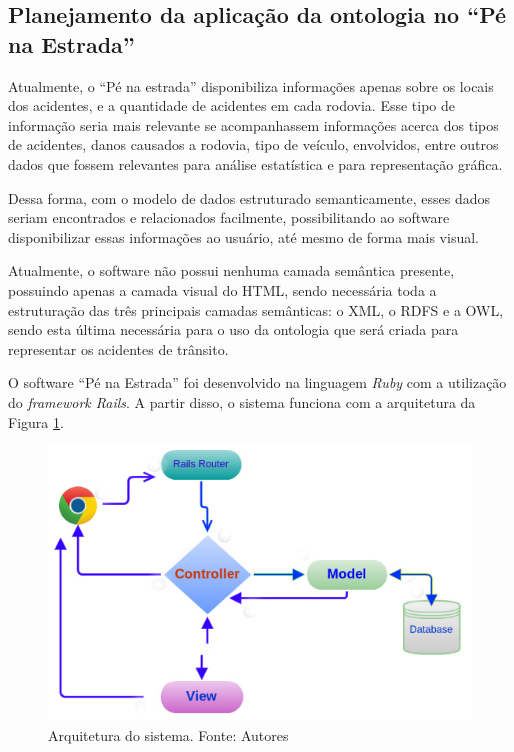 \subsection{Planejamento da aplicação da ontologia no ``Pé na Estrada''}

Atualmente, o “Pé na estrada” disponibiliza informações apenas sobre os locais dos
acidentes, e a quantidade de acidentes em cada rodovia. Esse tipo de informação seria mais
relevante se acompanhassem informações acerca dos tipos de acidentes, danos causados a
rodovia, tipo de veículo, envolvidos, entre outros dados que fossem relevantes para análise
estatística e para representação gráfica.

Dessa forma, com o modelo de dados estruturado semanticamente, esses dados seriam
encontrados e relacionados facilmente, possibilitando ao software disponibilizar essas
informações ao usuário, até mesmo de forma mais visual.

Atualmente, o software não possui nenhuma camada semântica presente, possuindo
apenas a camada visual do HTML, sendo necessária toda a estruturação das três principais
camadas semânticas: o XML, o RDFS e a OWL, sendo esta última necessária para o uso da
ontologia que será criada para representar os acidentes de trânsito.

O software ``Pé na Estrada'' foi desenvolvido na linguagem \textit{Ruby} com a utilização do \textit{framework Rails}. 
A partir disso, o sistema funciona com a arquitetura da Figura \ref{fig:arquitetura}.

\begin{figure}[!htb]
 \centering
 \includegraphics[scale = 0.7]{figuras/arquiteturarails.png}
 \caption[Arquitetura do \textit{software} “Pé na Estrada”]{Arquitetura do sistema. Fonte: Autores}
 \label{fig:arquitetura}

\end{figure}

